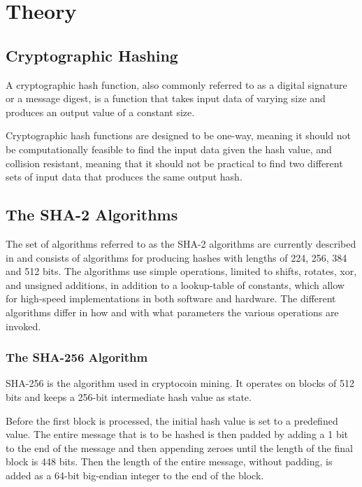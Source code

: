 \chapter{Theory}

\section{Cryptographic Hashing}

A cryptographic hash function, also commonly referred to as a digital signature or
a message digest, is a function that takes input data of varying size and
produces an output value of a constant size\cite{hashing-overview}.

Cryptographic hash functions are designed to be one-way, meaning it should
not be computationally feasible to find the input data given the hash value,
and collision resistant, meaning that it should not be practical to find two
different sets of input data that produces the same output hash\cite{sha-spec}.

\section{The SHA-2 Algorithms}

The set of algorithms referred to as the SHA-2 algorithms are currently described in \cite{fips180-4}
and consists of algorithms for producing hashes with lengths of 224, 256, 384 and 512 bits.
The algorithms use simple operations, limited to shifts, rotates, xor, and unsigned additions,
in addition to a lookup-table of constants, which allow for high-speed implementations in both
software and hardware. The different algorithms differ in how and with what parameters the various
operations are invoked.

\subsection{The SHA-256 Algorithm\cite{sha-spec}}

SHA-256 is the algorithm used in cryptocoin mining. It operates on blocks of 512 bits
and keeps a 256-bit intermediate hash value as state.

Before the first block is processed, the initial hash value is set to a predefined
value. The entire message that is to be hashed is then padded by adding a 1 bit to
the end of the message and then appending zeroes until the length of the final block
is 448 bits. Then the length of the entire message, without padding, is added as a
64-bit big-endian integer to the end of the block.

